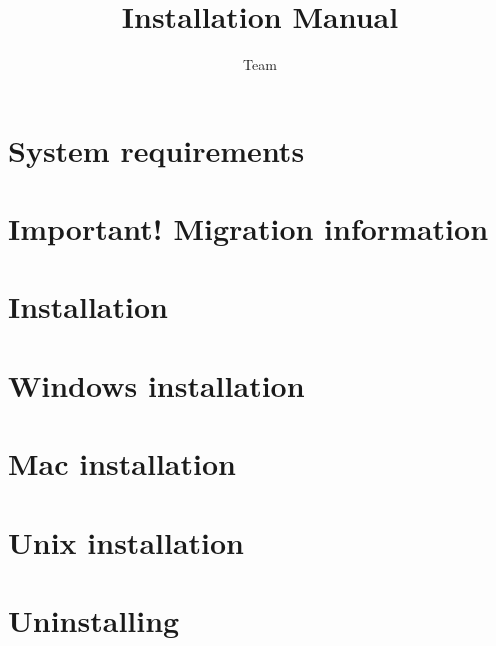 \documentclass[en,twoside,manual,guidancer]{bxreport}
\begin{document}
%
\title{\jb{} Installation Manual}
\author*{\jb{} Team}{}
\maketitle


\tableofcontents
\renewcommand{\bxcomment}[2]{}%
\clearpage
\setcounter{secnumdepth}{2}%

\chapter{System requirements}

\clearpage
\chapter{Important! Migration information}

\clearpage
\chapter{Installation}

\clearpage
\chapter{Windows installation}

\clearpage
\chapter{Mac installation}

\clearpage
\chapter{Unix installation}
\label{Unix}

\clearpage
\chapter{Uninstalling \jb{}}

\end{document}
